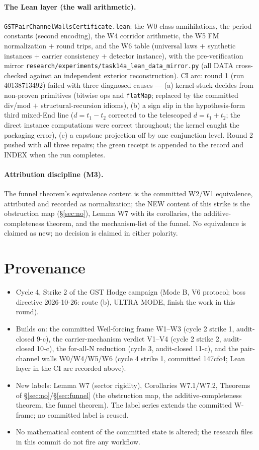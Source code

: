 \documentclass[11pt]{article}
\theoremstyle{definition}
\begin{document}
\paragraph{The Lean layer (the wall arithmetic).}
\texttt{GSTPairChannelWallsCertificate.lean}: the W0 class annihilations, the
period constants (second encoding), the W4 corridor arithmetic, the W5 FM
normalization $+$ round trips, and the W6 table (universal laws $+$ synthetic
instances $+$ carrier consistency $+$ detector instance), with the
pre-verification mirror
\texttt{research/experiments/task14a\_lean\_data\_mirror.py} (all DATA
cross-checked against an independent exterior reconstruction). CI arc: round 1
(run 40138713492) failed with three diagnosed causes --- (a) kernel-stuck
decides from non-proven primitives (bitwise ops and \texttt{flatMap}; replaced
by the committed div/mod $+$ structural-recursion idioms), (b) a sign slip in
the hypothesis-form third mixed-End line ($d=t_1-t_2$ corrected to the
telescoped $d=t_1+t_2$; the direct instance computations were correct
throughout; the kernel caught the packaging error), (c) a capstone projection
off by one conjunction level. Round 2 pushed with all three repairs; the green
receipt is appended to the record and INDEX when the run completes.

\paragraph{Attribution discipline (M3).} The funnel theorem's equivalence
content is the committed W2/W1 equivalence, attributed and recorded as
normalization; the NEW content of this strike is the obstruction map
(\S\ref{sec:no}), Lemma W7 with its corollaries, the additive-completeness
theorem, and the mechanism-list of the funnel. No equivalence is claimed as
new; no decision is claimed in either polarity.

\section{Provenance}

\begin{itemize}
\item Cycle 4, Strike 2 of the GST Hodge campaign (Mode B, V6 protocol; boss
directive 2026-10-26: route (b), ULTRA MODE, finish the work in this round).
\item Builds on: the committed Weil-forcing frame W1--W3 (cycle 2 strike 1,
audit-closed 9-c), the carrier-mechanism verdict V1--V4 (cycle 2 strike 2,
audit-closed 10-c), the for-all-N reduction (cycle 3, audit-closed 11-c), and
the pair-channel walls W0/W4/W5/W6 (cycle 4 strike 1, committed 147cfc4;
Lean layer in the CI arc recorded above).
\item New labels: Lemma W7 (sector rigidity), Corollaries W7.1/W7.2,
Theorems of \S\ref{sec:no}/\S\ref{sec:funnel} (the obstruction map, the
additive-completeness theorem, the funnel theorem). The label series extends
the committed W-frame; no committed label is reused.
\item No mathematical content of the committed state is altered; the research
files in this commit do not fire any workflow.
\end{itemize}
\end{document}
